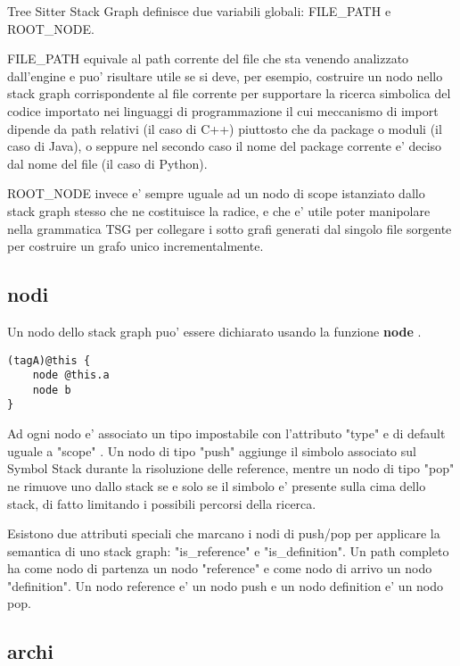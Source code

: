 Tree Sitter Stack Graph definisce due variabili globali: FILE\_PATH e ROOT\_NODE.

FILE\_PATH equivale al path corrente del file che sta venendo analizzato dall'engine e puo' risultare utile se si deve, per esempio, costruire un nodo nello stack graph corrispondente al file corrente per supportare la ricerca simbolica del codice importato nei linguaggi di programmazione il cui meccanismo di import dipende da path relativi (il caso di C++) piuttosto che da package o moduli (il caso di Java), o seppure nel secondo caso il nome del package corrente e' deciso dal nome del file (il caso di Python).

ROOT\_NODE invece e' sempre uguale ad un nodo di scope istanziato dallo stack graph stesso che ne costituisce la radice, e che e' utile poter manipolare nella grammatica TSG per collegare i sotto grafi generati dal singolo file sorgente per costruire un grafo unico incrementalmente.

\subsection{nodi}

Un nodo dello stack graph puo' essere dichiarato usando la funzione \textbf{node} \cite{TreeSitterGraphReferenceGraphNodes}.

\begin{lstlisting}
(tagA)@this {
    node @this.a
    node b
}
\end{lstlisting}

Ad ogni nodo e' associato un tipo impostabile con l'attributo "type" e di default uguale a "scope" \cite{TreeSitterStackGraphNodes}.
Un nodo di tipo "push" aggiunge il simbolo associato sul Symbol Stack durante la risoluzione delle reference, mentre un nodo di tipo "pop" ne rimuove uno dallo stack se e solo se il simbolo e' presente sulla cima dello stack, di fatto limitando i possibili percorsi della ricerca.

Esistono due attributi speciali che marcano i nodi di push/pop per applicare la semantica di uno stack graph: "is\_reference" e "is\_definition".
Un path completo ha come nodo di partenza un nodo "reference" e come nodo di arrivo un nodo "definition".
Un nodo reference e' un nodo push e un nodo definition e' un nodo pop.

\subsection{archi}

